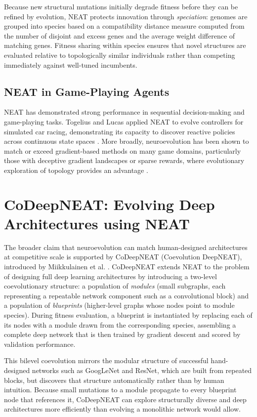 Because new structural mutations initially degrade fitness before they can be refined by evolution, NEAT protects innovation through \textit{speciation}: genomes are grouped into species based on a compatibility distance measure computed from the number of disjoint and excess genes and the average weight difference of matching genes. Fitness sharing within species ensures that novel structures are evaluated relative to topologically similar individuals rather than competing immediately against well-tuned incumbents.

\subsection{NEAT in Game-Playing Agents}

NEAT has demonstrated strong performance in sequential decision-making and game-playing tasks. Togelius and Lucas applied NEAT to evolve controllers for simulated car racing, demonstrating its capacity to discover reactive policies across continuous state spaces \cite{togelius2005evolving, togelius2006evolving}. More broadly, neuroevolution has been shown to match or exceed gradient-based methods on many game domains, particularly those with deceptive gradient landscapes or sparse rewards, where evolutionary exploration of topology provides an advantage \cite{risi2015neuroevolution}.

\section{CoDeepNEAT: Evolving Deep Architectures using NEAT}

The broader claim that neuroevolution can match human-designed architectures at competitive scale is supported by CoDeepNEAT (Coevolution DeepNEAT), introduced by Miikkulainen et al. \cite{miikkulainen2019evolving}. CoDeepNEAT extends NEAT to the problem of designing full deep learning architectures by introducing a two-level coevolutionary structure: a population of \textit{modules} (small subgraphs, each representing a repeatable network component such as a convolutional block) and a population of \textit{blueprints} (higher-level graphs whose nodes point to module species). During fitness evaluation, a blueprint is instantiated by replacing each of its nodes with a module drawn from the corresponding species, assembling a complete deep network that is then trained by gradient descent and scored by validation performance.

This bilevel coevolution mirrors the modular structure of successful hand-designed networks such as GoogLeNet and ResNet, which are built from repeated blocks, but discovers that structure automatically rather than by human intuition. Because small mutations to a module propagate to every blueprint node that references it, CoDeepNEAT can explore structurally diverse and deep architectures more efficiently than evolving a monolithic network would allow.

